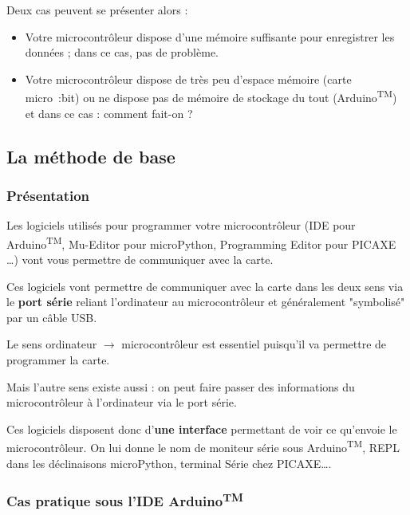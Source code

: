 \documentclass[11pt]{article}
\begin{document}
 Deux cas peuvent se présenter alors : 
 \begin{itemize}
  \item Votre microcontrôleur dispose d'une mémoire suffisante pour enregistrer les données ; dans ce cas, pas de problème.
  \item Votre microcontrôleur dispose de très peu d'espace mémoire (carte micro~:bit) ou ne dispose pas de mémoire de stockage du tout (Arduino\textsuperscript{TM}) et dans ce cas : comment fait-on ?
 \end{itemize}

 \subsection{La méthode de base}
 
 \subsubsection{Présentation}
 
 Les logiciels utilisés pour programmer votre microcontrôleur (IDE pour Arduino\textsuperscript{TM}, Mu-Editor pour microPython, Programming Editor pour PICAXE \ldots) vont vous permettre de communiquer avec la carte.
 
 \smallskip
 Ces logiciels vont permettre de communiquer avec la carte dans les deux sens via le \textbf{port série} reliant l'ordinateur au microcontrôleur et généralement "symbolisé" par un câble USB.
 
 \smallskip
 Le sens ordinateur $\rightarrow$ microcontrôleur est essentiel puisqu'il va permettre de programmer la carte.
 
 \medskip
 Mais l'autre sens existe aussi : on peut faire passer des informations du microcontrôleur à l'ordinateur via le port série.
 
 \medskip
 Ces logiciels disposent donc d'\textbf{une interface} permettant de voir ce qu'envoie le microcontrôleur. On lui donne le nom de moniteur série sous Arduino\textsuperscript{TM}, REPL dans les déclinaisons microPython, terminal Série chez PICAXE\ldots.
 
 
 
 
 
 
 
 
 
 
 \subsubsection{Cas pratique sous l'IDE Arduino\textsuperscript{TM}}
 
\end{document}
